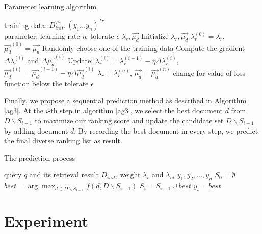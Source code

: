 \documentclass[review]{elsarticle}
\begin{document}
\begin{algorithm}[htb]
	\caption{Parameter learning algorithm}
	\begin{algorithmic}[1]
		\REQUIRE training data: $D_{init}^{Tr}, (y_1...y_n)^{Tr}$\\
		parameter: learning rate $\eta$, tolerate $\epsilon$
		\ENSURE $\lambda_r, \vec{\mu_d}$
		\STATE Initialize $\lambda_r, \vec{\mu_d}$
		\REPEAT
		\STATE $\lambda_r^{(0)}=\lambda_r$, $\vec{\mu_d}^{(0)}=\vec{\mu_d}$
		\STATE Randomly choose one of the training data
		\STATE Compute the gradient $\Delta\lambda_r^{(i)}$ and $\Delta\vec{\mu_d}^{(i)}$
		\STATE Update: $\lambda_r^{(i)}=\lambda_r^{(i-1)}-\eta\Delta\lambda_r^{(i)}$, $\vec{\mu_d}^{(i)}=\vec{\mu_d}^{(i-1)}-\eta\Delta\vec{\mu_d}^{(i)}$
		\ENDFOR
		\STATE $\lambda_r=\lambda_r^{(n)}$, $\vec{\mu_d}=\vec{\mu_d}^{(n)}$
		\UNTIL change for value of loss function below the tolerate $\epsilon$
	\end{algorithmic}
	\label{ag2}
\end{algorithm}


Finally, we propose a sequential prediction method as described in Algorithm \ref{ag3}. At the $i$-th step in algorithm \ref{ag3}, we select the best document $d$ from $D\backslash S_{i-1}$ to maximize our ranking score and update the candidate set $D\backslash S_{i-1}$ by adding document $d$. By recording the best document in every step, we predict the final diverse ranking list as result.

\begin{algorithm}[H]
	\caption{The prediction process}
	\begin{algorithmic}[1]
		\REQUIRE query $q$ and its retrieval result $D_{init}$, weight $\lambda_r$ and $\lambda_{nl}$
		\ENSURE $y_1,y_2,...,y_n$
		\STATE $S_0=\emptyset$
		\STATE $best = \arg\max_{d\in D\backslash S_{i-1}}f(d, D\backslash S_{i-1})$
		\STATE $S_i=S_{i-1}\cup best$
		\STATE $y_i=best$
		\ENDFOR
	\end{algorithmic}
	\label{ag3}
\end{algorithm}


\section{Experiment}\label{sec_setup}
%
\end{document}

